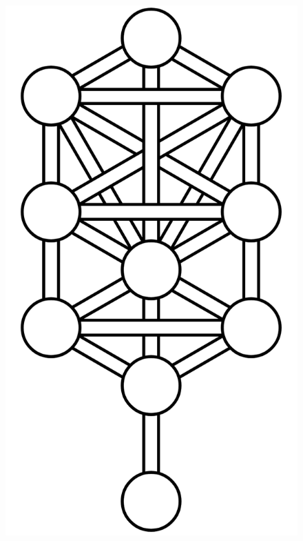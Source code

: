 \documentclass[17pt]{extreport}
\begin{document}
	\begin{figure}
		\centering
		\includegraphics[width=5.5in]{imageserver/uploadimages/image1.png}
	\end{figure}
	
	
	
	
	
\end{document}

